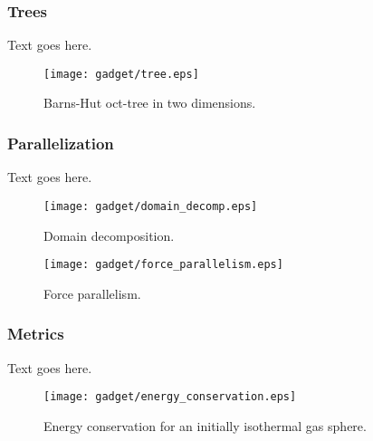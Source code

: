 \subsubsection{Trees}
\label{subsubsec:gadget--gadget--trees}


Text goes here.

\begin{figure}[t]
	\centering
	\texttt{[image: gadget/tree.eps]}
	\caption[Barns-Hut oct-tree in two dimensions.]{Barns-Hut oct-tree in two dimensions.}
	\label{fig:gadget--tree}
\end{figure}



\subsubsection{Parallelization}
\label{subsubsec:gadget--gadget--parallelization}


Text goes here.

\begin{figure}[t]
	\centering
	\texttt{[image: gadget/domain\_decomp.eps]}
	\caption[Domain decomposition.]{Domain decomposition.}
	\label{fig:gadget--domain_decomp}
\end{figure}

\begin{figure}[t]
	\centering
	\texttt{[image: gadget/force\_parallelism.eps]}
	\caption[Force parallelism.]{Force parallelism.}
	\label{fig:gadget--force_parallelism}
\end{figure}



\subsubsection{Metrics}
\label{subsubsec:gadget--gadget--metrics}


Text goes here.

\begin{figure}[t]
	\centering
	\texttt{[image: gadget/energy\_conservation.eps]}
	\caption[Energy conservation for an initially isothermal gas sphere.]{Energy conservation for an initially isothermal gas sphere.}
	\label{fig:gadget--force_parallelism}
\end{figure}




